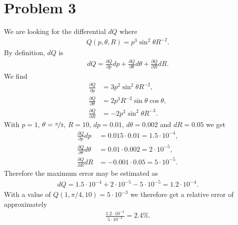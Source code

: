 \documentclass{article}
\newcommand{\p}{\partial }
\begin{document}
\section*{Problem 3}
We are looking for the differential $dQ$ where
\begin{align*}
  Q(p, \theta, R)=p^3\sin^2\theta R^{-2}.
\end{align*}
By definition, $dQ$ is
\begin{align*}
  dQ=\frac{\p Q}{\p p}dp + \frac{\p Q}{\p\theta}d\theta + \frac{\p Q}{\p R}dR.
\end{align*}
We find
\begin{align*}
  \frac{\p Q}{\p p}&= 3p^2\sin^2\theta R^{-2},\\
  \frac{\p Q}{\p\theta}&= 2p^3R^{-2}\sin\theta\cos\theta,\\
  \frac{\p Q}{\p R}&=-2p^3\sin^2\theta R^{-3}.
\end{align*}
With $p=1$, $\theta=\nicefrac{\pi}{2}$, $R=10$, $dp=0.01$,
$d\theta = 0.002$ and $dR=0.05$ we get
\begin{align*}
  \frac{\p Q}{\p p}dp&=0.015\cdot0.01 = 1.5\cdot 10^{-4},\\
  \frac{\p Q}{\p\theta}d\theta&=0.01\cdot 0.002=2\cdot 10^{-5},\\
  \frac{\p Q}{\p R}dR&=-0.001\cdot 0.05=5\cdot 10^{-5}.
\end{align*}
Therefore the maximum error may be estimated as
\begin{align*}
  dQ=1.5\cdot 10^{-4}+2\cdot 10^{-5} - 5\cdot10^{-5}=1.2\cdot10^{-4}.
\end{align*}
With a value of $Q(1,\pi/4,10)=5\cdot10^{-3}$ we therefore get a
relative error of approximately 
\begin{align*}
  \frac{1.2\cdot10^{-4}}{5\cdot 10^{-3}}=2.4\%.
\end{align*}
\end{document}
